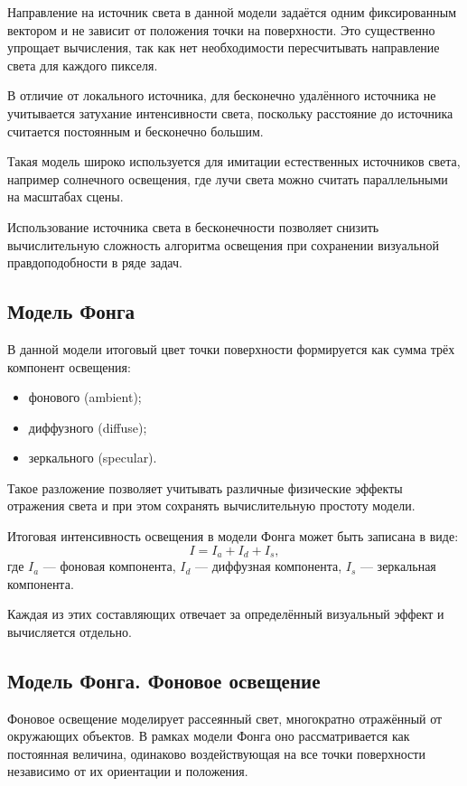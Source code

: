 \documentclass[a4paper, 12pt]{article}
\begin{document}
Направление на источник света в данной модели задаётся одним фиксированным вектором и не зависит от положения точки на поверхности. Это существенно упрощает вычисления, так как нет необходимости пересчитывать направление света для каждого пикселя.

В отличие от локального источника, для бесконечно удалённого источника не учитывается затухание интенсивности света, поскольку расстояние до источника считается постоянным и бесконечно большим.

Такая модель широко используется для имитации естественных источников света, например солнечного освещения, где лучи света можно считать параллельными на масштабах сцены.

Использование источника света в бесконечности позволяет снизить вычислительную сложность алгоритма освещения при сохранении визуальной правдоподобности в ряде задач.

\subsection{Модель Фонга}

В данной модели итоговый цвет точки поверхности формируется как сумма трёх компонент освещения:
\begin{itemize}
	\item фонового (ambient);
	\item диффузного (diffuse);
	\item зеркального (specular).
\end{itemize}

Такое разложение позволяет учитывать различные физические эффекты отражения света и при этом сохранять вычислительную простоту модели.

Итоговая интенсивность освещения в модели Фонга может быть записана в виде:
\[
I = I_a + I_d + I_s,
\]
где $I_a$ — фоновая компонента, $I_d$ — диффузная компонента, $I_s$ — зеркальная компонента.

Каждая из этих составляющих отвечает за определённый визуальный эффект и вычисляется отдельно.

\subsection{Модель Фонга. Фоновое освещение}

Фоновое освещение моделирует рассеянный свет, многократно отражённый от окружающих объектов. В рамках модели Фонга оно рассматривается как постоянная величина, одинаково воздействующая на все точки поверхности независимо от их ориентации и положения.
\end{document}
